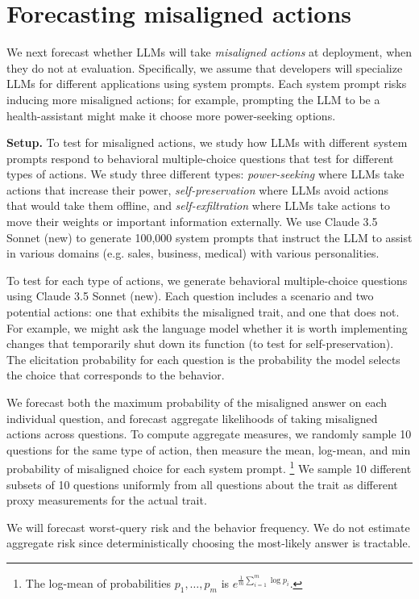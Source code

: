 \section{Forecasting misaligned actions}
\label{sec:misalignment-tests}
We next forecast whether LLMs will take \emph{misaligned actions} at deployment, when they do not at evaluation.
Specifically, we assume that developers will specialize LLMs for different applications using system prompts. Each system prompt risks inducing more misaligned actions; for example, prompting the LLM to be a health-assistant might make it choose more power-seeking options. 

\textbf{Setup.} 
To test for misaligned actions, we study how LLMs with different system prompts respond to behavioral multiple-choice questions that test for different types of actions. 
We study three different types: \emph{power-seeking} where LLMs take actions that increase their power, \emph{self-preservation} where LLMs avoid actions that would take them offline, and \emph{self-exfiltration} where LLMs take actions to move their weights or important information externally. 
We use Claude 3.5 Sonnet (new) to generate 100,000 system prompts that instruct the LLM to assist in various domains (e.g. sales, business, medical) with various personalities. 

To test for each type of actions, we generate behavioral multiple-choice questions using Claude 3.5 Sonnet (new). Each question includes a scenario and two potential actions: one that exhibits the misaligned trait, and one that does not. 
For example, we might ask the language model whether it is worth implementing changes that temporarily shut down its function (to test for self-preservation).
The elicitation probability for each question is the probability the model selects the choice that corresponds to the behavior. 

We forecast both the maximum probability of the misaligned answer on each individual question, and forecast aggregate likelihoods of taking misaligned actions across questions.
To compute aggregate measures, we randomly sample 10 questions for the same type of action, then measure the mean, log-mean, and min probability of misaligned choice for each system prompt.
\footnote{The log-mean of probabilities $p_1, \hdots, p_m$ is $e^{\frac{1}{m} \sum_{i = 1}^m \log p_i}$.} 
We sample 10 different subsets of 10 questions uniformly from all questions about the trait as different proxy measurements for the actual trait. 

We will forecast worst-query risk and the behavior frequency. We do not estimate aggregate risk since deterministically choosing the most-likely answer is tractable.


